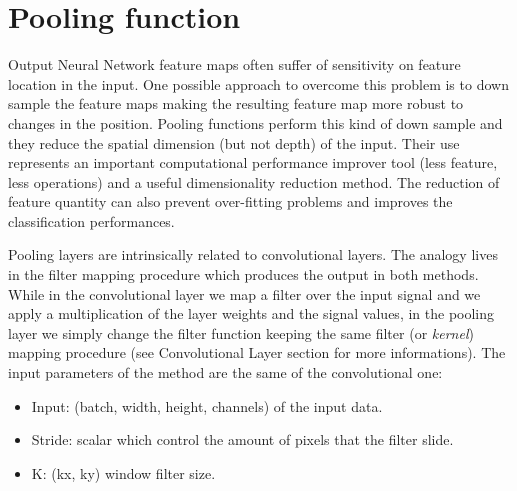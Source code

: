\documentclass{standalone}
\begin{document}
\section[Pooling]{Pooling function}\label{pooling}

Output Neural Network feature maps often suffer of sensitivity on feature location in the input.
One possible approach to overcome this problem is to down sample the feature maps making the resulting feature map more robust to changes in the position.
Pooling functions perform this kind of down sample and they reduce the spatial dimension (but not depth) of the input.
Their use represents an important computational performance improver tool (less feature, less operations) and a useful dimensionality reduction method.
The reduction of feature quantity can also prevent over-fitting problems and improves the classification performances.

Pooling layers are intrinsically related to convolutional layers.
The analogy lives in the filter mapping procedure which produces the output in both methods.
While in the convolutional layer we map a filter over the input signal and we apply a multiplication of the layer weights and the signal values, in the pooling layer we simply change the filter function keeping the same filter (or \emph{kernel}) mapping procedure (see Convolutional Layer section for more informations).
The input parameters of the method are the same of the convolutional one:

\begin{itemize}

\item Input: (batch, width, height, channels) of the input data.

\item Stride: scalar which control the amount of pixels that the filter slide.

\item K: (kx, ky) window filter size.

\end{itemize}
\end{document}
